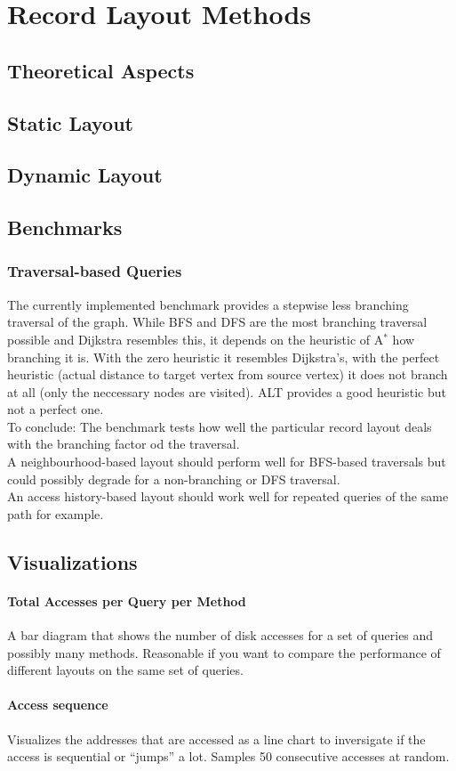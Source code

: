 \section{Record Layout Methods}

\subsection{Theoretical Aspects}

\subsection{Static Layout}

\subsection{Dynamic Layout}

 \subsection{Benchmarks}
    \subsubsection{Traversal-based Queries}
    The currently implemented benchmark provides a stepwise less branching traversal of the graph. While BFS and DFS are the most branching traversal possible and Dijkstra resembles this, it depends on the heuristic of A$^*$ how branching it is. With the zero heuristic it resembles Dijkstra's, with the perfect heuristic (actual distance to target vertex from source vertex) it does not branch at all (only the neccessary nodes are visited). ALT provides a good heuristic but not a perfect one. \\
    To conclude: The benchmark tests how well the particular record layout deals with the branching factor od the traversal. \\
    A neighbourhood-based layout should perform well for BFS-based traversals but could possibly degrade for a non-branching or DFS traversal. \\
    An access history-based layout should work well for repeated queries of the same path for example.
    
    
 \subsection{Visualizations}
    \paragraph{Total Accesses per Query per Method}
    A bar diagram that shows the number of disk accesses for a set of queries and possibly many methods. Reasonable if you want to compare the performance of different layouts on the same set of queries.
    
    \paragraph{Access sequence} Visualizes the addresses that are accessed as a line chart to inversigate if the access is sequential or ``jumps'' a lot. Samples 50 consecutive accesses at random.


